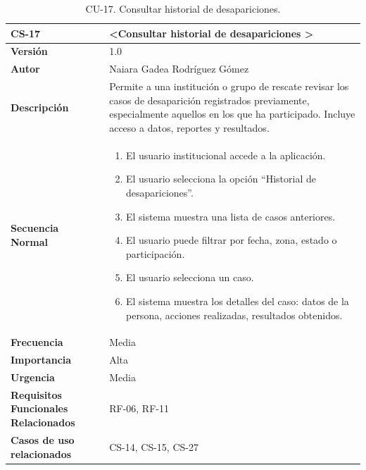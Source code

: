 \begin{table}[htbp] %
\centering
\begin{tabular}{ |m{3cm}|m{11cm}|  } 
\hline
\cellcolor[HTML]{B9E3F0}\centering\textbf{CS-17} & \cellcolor[HTML]{B9E3F0}\textbf{\textless Consultar historial de desapariciones \textgreater}\\

\hline
\cellcolor[HTML]{EFEFEF}\textbf{Versión}             & 1.0  \\
\hline
\cellcolor[HTML]{EFEFEF}\textbf{Autor}                & Naiara Gadea Rodríguez Gómez\\
\hline
\cellcolor[HTML]{EFEFEF}\textbf{Descripción}                & {Permite a una institución o grupo de rescate revisar los casos de desaparición registrados previamente, especialmente aquellos en los que ha participado. Incluye acceso a datos, reportes y resultados.}\\
\hline
\cellcolor[HTML]{EFEFEF}\textbf{Secuencia \newline Normal}                &                 
        \begin{enumerate}
			\item El usuario institucional accede a la aplicación.
			\item El usuario selecciona la opción “Historial de desapariciones”.
			\item El sistema muestra una lista de casos anteriores.
			\item El usuario puede filtrar por fecha, zona, estado o participación.
			\item El usuario selecciona un caso.
			\item El sistema muestra los detalles del caso: datos de la persona, acciones realizadas, resultados obtenidos.
		\end{enumerate}\\
\hline
\cellcolor[HTML]{EFEFEF}\textbf{Frecuencia}                & Media\\
\hline
\cellcolor[HTML]{EFEFEF}\textbf{Importancia}                & Alta\\
\hline
\cellcolor[HTML]{EFEFEF}\textbf{Urgencia}                & Media\\
\hline
\cellcolor[HTML]{EFEFEF}\textbf{Requisitos Funcionales Relacionados}                & {RF-06, RF-11}\\
\hline
\cellcolor[HTML]{EFEFEF}\textbf{Casos de uso relacionados}                & {CS-14, CS-15, CS-27}\\
\hline
\end{tabular}
\caption{CU-17. Consultar historial de desapariciones.}
\end{table}

